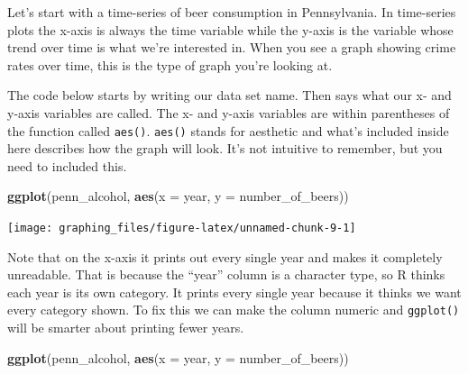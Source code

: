 \documentclass[
  12pt,
]{book}
\newenvironment{Shaded}{\begin{snugshade}}{\end{snugshade}}
\newcommand{\DataTypeTok}[1]{\textcolor[rgb]{0.13,0.29,0.53}{#1}}
\newcommand{\KeywordTok}[1]{\textcolor[rgb]{0.13,0.29,0.53}{\textbf{#1}}}
\newcommand{\NormalTok}[1]{#1}
\newcommand{\OperatorTok}[1]{\textcolor[rgb]{0.81,0.36,0.00}{\textbf{#1}}}
\newcommand{\StringTok}[1]{\textcolor[rgb]{0.31,0.60,0.02}{#1}}
\begin{document}
Let's start with a time-series of beer consumption in Pennsylvania. In time-series plots the x-axis is always the time variable while the y-axis is the variable whose trend over time is what we're interested in. When you see a graph showing crime rates over time, this is the type of graph you're looking at.

The code below starts by writing our data set name. Then says what our x- and y-axis variables are called. The x- and y-axis variables are within parentheses of the function called \texttt{aes()}. \texttt{aes()} stands for aesthetic and what's included inside here describes how the graph will look. It's not intuitive to remember, but you need to included this.

\begin{Shaded}
\begin{Highlighting}[]
\KeywordTok{ggplot}\NormalTok{(penn\_alcohol, }\KeywordTok{aes}\NormalTok{(}\DataTypeTok{x =}\NormalTok{ year,}
                         \DataTypeTok{y =}\NormalTok{ number\_of\_beers))}
\end{Highlighting}
\end{Shaded}

\begin{center}\texttt{[image: graphing\_files/figure-latex/unnamed-chunk-9-1]} \end{center}

Note that on the x-axis it prints out every single year and makes it completely unreadable. That is because the ``year'' column is a character type, so R thinks each year is its own category. It prints every single year because it thinks we want every category shown. To fix this we can make the column numeric and \texttt{ggplot()} will be smarter about printing fewer years.

\begin{Shaded}
\end{Shaded}

\begin{Shaded}
\begin{Highlighting}[]
\KeywordTok{ggplot}\NormalTok{(penn\_alcohol, }\KeywordTok{aes}\NormalTok{(}\DataTypeTok{x =}\NormalTok{ year,}
                         \DataTypeTok{y =}\NormalTok{ number\_of\_beers))}
\end{Highlighting}
\end{Shaded}
\end{document}

